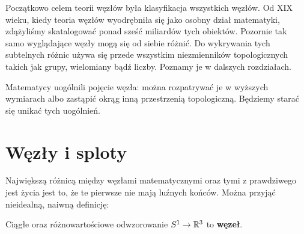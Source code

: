 Początkowo celem teorii węzłów była klasyfikacja wszystkich węzłów.
Od XIX wieku, kiedy teoria węzłów wyodrębniła się jako osobny dział matematyki,
zdążyliśmy skatalogować ponad sześć miliardów tych obiektów.
Pozornie tak samo wyglądające węzły mogą się od siebie różnić.
Do wykrywania tych subtelnych różnic używa się przede wszystkim niezmienników topologicznych takich jak grupy, wielomiany bądź liczby.
Poznamy je w dalszych rozdziałach.

Matematycy uogólnili pojęcie węzła:
można rozpatrywać je w wyższych wymiarach albo zastąpić okrąg inną przestrzenią topologiczną.
Będziemy starać się unikać tych uogólnień.

\section{Węzły i sploty}
Największą różnicą między węzłami matematycznymi oraz tymi z prawdziwego jest życia jest to, że te pierwsze nie mają luźnych końców.
Można przyjąć nieidealną, naiwną definicję:

\begin{definition}
	Ciągłe oraz różnowartościowe odwzorowanie $S^1 \to \mathbb R^3$ to \textbf{węzeł}.
\end{definition}

